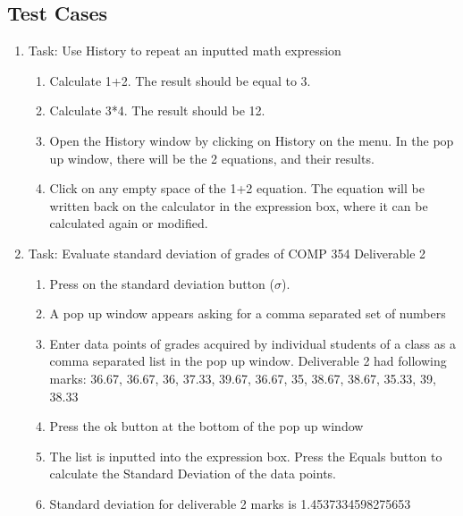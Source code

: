     \subsection{Test Cases}
        \begin{enumerate}
            \item Task: Use History to repeat an inputted math expression
            \begin{enumerate}
                \item Calculate 1+2. The result should be equal to 3.
                \item Calculate 3*4. The result should be 12.
                \item Open the History window by clicking on History on the menu. In the pop up window, there will be the 2 equations, and their results.
                \item Click on any empty space of the 1+2 equation. The equation will be written back on the calculator in the expression box, where it can be calculated again or modified.
            \end{enumerate}

            \item Task: Evaluate standard deviation of grades of COMP 354 Deliverable 2
            \begin{enumerate}
                    \item Press on the standard deviation button ($\sigma$).
                    \item A pop up window appears asking for a comma separated set of numbers
                    \item Enter data points of grades acquired by individual students of a class as a comma separated list in the pop up window. Deliverable 2 had following marks: 36.67, 36.67, 36, 37.33, 39.67, 36.67, 35, 38.67, 38.67, 35.33, 39, 38.33
                    \item Press the ok button at the bottom of the pop up window
                    \item The list is inputted into the expression box. Press the Equals button to calculate the Standard Deviation of the data points.
                    \item Standard deviation for deliverable 2 marks is 1.4537334598275653
                \end{enumerate}


\end{enumerate}
